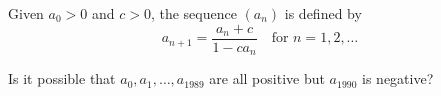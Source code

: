 Given $a_0 > 0$ and $c > 0$,  the sequence $(a_n)$ is defined by\[a_{n+1}=\frac{a_n+c}{1-ca_n}\quad\text{for }n=1,2,\dots\]

Is it possible that $a_0, a_1, \dots , a_{1989}$ are all positive but $a_{1990}$ is negative?